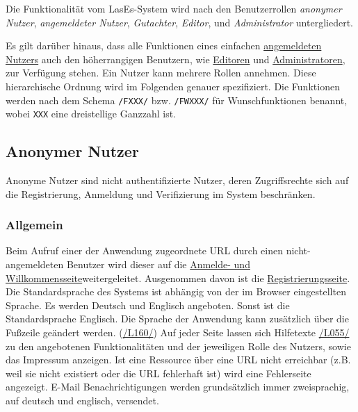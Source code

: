 

Die Funktionalität vom LasEs-System wird nach den Benutzerrollen
\textit{anonymer Nutzer}, \textit{angemeldeter Nutzer}, \textit{Gutachter}, \textit{Editor}, und
\textit{Administrator} untergliedert.

Es gilt darüber hinaus, dass alle Funktionen eines einfachen \hyperref[glo:regnutzer]{angemeldeten Nutzers} auch den höherrangigen Benutzern, wie
\hyperref[glo:editor]{Editoren} und \hyperref[glo:admin]{Administratoren}, zur Verfügung stehen. Ein Nutzer kann mehrere Rollen annehmen.
Diese hierarchische Ordnung wird im Folgenden genauer spezifiziert.
Die Funktionen werden nach dem Schema \texttt{/FXXX/} bzw. \texttt{/FWXXX/} für Wunschfunktionen benannt, wobei \texttt{XXX} eine dreistellige Ganzzahl ist.

\subsection{Anonymer Nutzer}\label{funkt:nutzer}
Anonyme Nutzer sind nicht authentifizierte Nutzer, deren Zugriffsrechte sich
auf die Registrierung, Anmeldung und Verifizierung im System beschränken.

\subsubsection{Allgemein}
\begin{description}
     Beim Aufruf einer der Anwendung zugeordnete URL durch einen nicht-angemeldeten Benutzer
    wird dieser auf die \hyperref[an:log]{Anmelde- und Willkommensseite}weitergeleitet. Ausgenommen davon ist die \hyperref[an:reg]{Registrierungsseite}.
     Die Standardsprache des Systems ist abhängig von der im Browser
    eingestellten Sprache. Es werden Deutsch und Englisch angeboten.
    Sonst ist die Standardsprache Englisch. Die Sprache der Anwendung kann zusätzlich über die
    Fußzeile geändert werden. (\hyperref[leist:160]{/L160/})
     Auf jeder Seite lassen sich
    Hilfetexte \hyperref[leist:055]{/L055/} zu den angebotenen Funktionalitäten und der jeweiligen Rolle
    des Nutzers, sowie das Impressum anzeigen.
     Ist eine Ressource über eine URL nicht erreichbar (z.B. weil sie nicht existiert oder
     die URL fehlerhaft ist) wird eine Fehlerseite angezeigt.
     E-Mail Benachrichtigungen werden grundsätzlich immer zweisprachig,
    auf deutsch und englisch, versendet.
\end{description}

